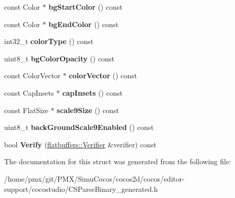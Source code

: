 \begin{DoxyCompactItemize}
\item 
\mbox{\label{structflatbuffers_1_1PageViewOptions_a29cd6010443396a575f7bc335aabb91d}} 
const Color $\ast$ {\bfseries bg\+Start\+Color} () const
\item 
\mbox{\label{structflatbuffers_1_1PageViewOptions_aef0a23b3b6a96dbdd9392105e0795271}} 
const Color $\ast$ {\bfseries bg\+End\+Color} () const
\item 
\mbox{\label{structflatbuffers_1_1PageViewOptions_aa7569434383a1a703f48e2a7da21ad9e}} 
int32\+\_\+t {\bfseries color\+Type} () const
\item 
\mbox{\label{structflatbuffers_1_1PageViewOptions_a085da84dddfdc6d0d962172b7eddef07}} 
uint8\+\_\+t {\bfseries bg\+Color\+Opacity} () const
\item 
\mbox{\label{structflatbuffers_1_1PageViewOptions_ac81e91d5590e1dfdb10cb7e9defa7d94}} 
const Color\+Vector $\ast$ {\bfseries color\+Vector} () const
\item 
\mbox{\label{structflatbuffers_1_1PageViewOptions_a1d2f744cd5ccab96d730b681d7d3b3ce}} 
const Cap\+Insets $\ast$ {\bfseries cap\+Insets} () const
\item 
\mbox{\label{structflatbuffers_1_1PageViewOptions_aa9207e511430e607a24d8cd359dfe3d3}} 
const Flat\+Size $\ast$ {\bfseries scale9\+Size} () const
\item 
\mbox{\label{structflatbuffers_1_1PageViewOptions_a44ec52de2cdceb1196cfb370df0875bd}} 
uint8\+\_\+t {\bfseries back\+Ground\+Scale9\+Enabled} () const
\item 
\mbox{\label{structflatbuffers_1_1PageViewOptions_ac58a333c824251a46bd901e099297d81}} 
bool {\bfseries Verify} (\hyperlink{classflatbuffers_1_1Verifier}{flatbuffers\+::\+Verifier} \&verifier) const
\end{DoxyCompactItemize}


The documentation for this struct was generated from the following file\+:\begin{DoxyCompactItemize}
\item 
/home/pmx/git/\+P\+M\+X/\+Simu\+Cocos/cocos2d/cocos/editor-\/support/cocostudio/C\+S\+Parse\+Binary\+\_\+generated.\+h\end{DoxyCompactItemize}
